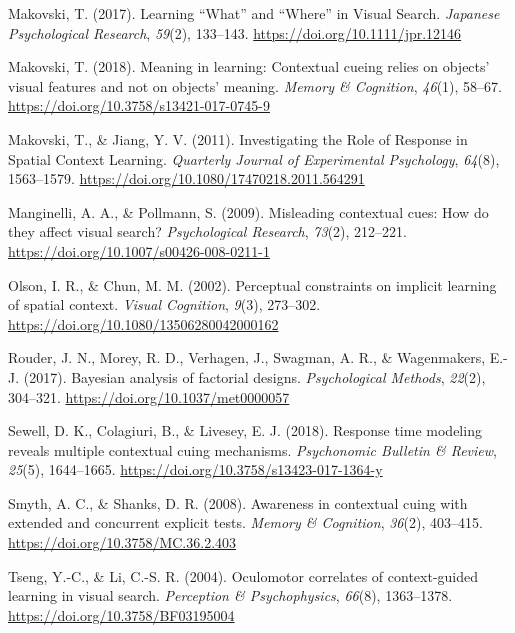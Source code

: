 \documentclass[
  man,floatsintext]{apa7}
\newlength{\cslhangindent}
\newlength{\cslentryspacingunit} %
\newenvironment{CSLReferences}[2] %
 {%
  \setlength{\parindent}{0pt}
  \ifodd #1
  \let\oldpar\par
  \def\par{\hangindent=\cslhangindent\oldpar}
  \fi
  \setlength{\parskip}{#2\cslentryspacingunit}
 }%
 {}
\begin{document}
\begin{CSLReferences}{1}{0}
\leavevmode{}%
Makovski, T. (2017). Learning {``{What}''} and {``{Where}''} in {Visual Search}. \emph{Japanese Psychological Research}, \emph{59}(2), 133--143. \url{https://doi.org/10.1111/jpr.12146}

\leavevmode{}%
Makovski, T. (2018). Meaning in learning: {Contextual} cueing relies on objects' visual features and not on objects' meaning. \emph{Memory \& Cognition}, \emph{46}(1), 58--67. \url{https://doi.org/10.3758/s13421-017-0745-9}

\leavevmode{}%
Makovski, T., \& Jiang, Y. V. (2011). Investigating the {Role} of {Response} in {Spatial Context Learning}. \emph{Quarterly Journal of Experimental Psychology}, \emph{64}(8), 1563--1579. \url{https://doi.org/10.1080/17470218.2011.564291}

\leavevmode{}%
Manginelli, A. A., \& Pollmann, S. (2009). Misleading contextual cues: {How} do they affect visual search? \emph{Psychological Research}, \emph{73}(2), 212--221. \url{https://doi.org/10.1007/s00426-008-0211-1}

\leavevmode{}%
Olson, I. R., \& Chun, M. M. (2002). Perceptual constraints on implicit learning of spatial context. \emph{Visual Cognition}, \emph{9}(3), 273--302. \url{https://doi.org/10.1080/13506280042000162}

\leavevmode{}%
Rouder, J. N., Morey, R. D., Verhagen, J., Swagman, A. R., \& Wagenmakers, E.-J. (2017). Bayesian analysis of factorial designs. \emph{Psychological Methods}, \emph{22}(2), 304--321. \url{https://doi.org/10.1037/met0000057}

\leavevmode{}%
Sewell, D. K., Colagiuri, B., \& Livesey, E. J. (2018). Response time modeling reveals multiple contextual cuing mechanisms. \emph{Psychonomic Bulletin \& Review}, \emph{25}(5), 1644--1665. \url{https://doi.org/10.3758/s13423-017-1364-y}

\leavevmode{}%
Smyth, A. C., \& Shanks, D. R. (2008). Awareness in contextual cuing with extended and concurrent explicit tests. \emph{Memory \& Cognition}, \emph{36}(2), 403--415. \url{https://doi.org/10.3758/MC.36.2.403}

\leavevmode{}%
Tseng, Y.-C., \& Li, C.-S. R. (2004). Oculomotor correlates of context-guided learning in visual search. \emph{Perception \& Psychophysics}, \emph{66}(8), 1363--1378. \url{https://doi.org/10.3758/BF03195004}


\end{CSLReferences}
\end{document}
